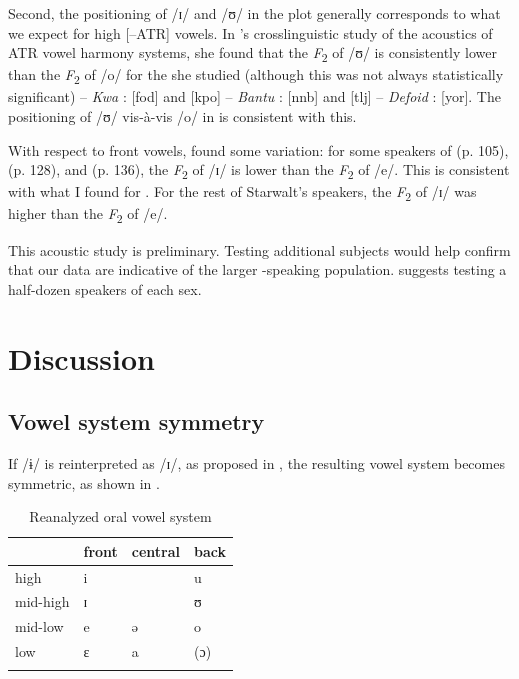 \documentclass[output=paper,colorlinks,citecolor=brown]{langscibook}
\begin{document}
Second, the positioning of /ɪ/ and /ʊ/ in the plot generally corresponds to what we expect for high [–ATR] vowels. In \citet{Starwalt2008}’s crosslinguistic study of the acoustics of ATR vowel harmony  systems, she found that the \textit{F}\textsubscript{2} of /ʊ/ is consistently lower than the \textit{F}\textsubscript{2} of /o/ for the  she studied (although this was not always statistically significant) -- \textit{Kwa} :  [fod] and  [kpo] -- \textit{Bantu} :  [nnb] and  [tlj] -- \textit{Defoid} :  [yor]. The positioning of /ʊ/ vis-à-vis /o/ in  is consistent with this.

With respect to front vowels, \citeauthor{Starwalt2008} found some variation: for some speakers of  (p. 105),  (p. 128), and  (p. 136), the \textit{F}\textsubscript{2} of /ɪ/ is lower than the \textit{F}\textsubscript{2} of /e/. This is consistent with what I found for . For the rest of Starwalt’s speakers, the \textit{F}\textsubscript{2} of /ɪ/ was higher than the \textit{F}\textsubscript{2} of /e/.

This acoustic study  is preliminary. Testing additional subjects would help confirm that our data are indicative of the larger -speaking population. \citet{Ladefoged2003} suggests testing a half-dozen speakers of each sex.

\section{Discussion}\label{sec:olson:4}

\subsection{Vowel system symmetry}

If /ɨ/ is reinterpreted as /ɪ/, as proposed in , the resulting  vowel system  becomes  symmetric, as shown in .

\begin{table}
\caption{Reanalyzed  oral vowel system}
\label{tab:olson:10}
    \begin{tabular}{llll}
    \lsptoprule
                    & front & central   & back\\
    \midrule
        high        & i     &           & u\\
        mid-high    & ɪ     &           & ʊ\\
        mid-low     & e     & ə         & o\\
        low         & ɛ     & a         & (ɔ)\\
    \lspbottomrule
    \end{tabular}
\end{table}
\end{document}
